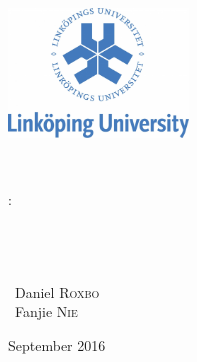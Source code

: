 \begin{titlepage}
\thispagestyle{empty}
\begin{center}

\begin{minipage}[t]{0.48\textwidth}
  \begin{flushleft}
    \includegraphics [width=48mm]{images/logo-univ.jpg} \\[0.5cm]

  \end{flushleft}
\end{minipage}
\begin{minipage}[t]{0.48\textwidth}
  \begin{flushright}

  \end{flushright}
\end{minipage} \\[1.0cm] %

\vspace{5.3cm}

\textsc{\Large \reportsubject :}\\[2cm]

\HRule \\[0.4cm]
{\Large \bfseries \reporttitle}\\[0.4cm]
\HRule \\[1.5cm]

\vspace{1.5cm}

\vspace{4cm}
\begin{minipage}[t]{0.30\textwidth}
  \begin{flushleft} \normalsize
     ~Daniel \textsc{Roxbo}\\
	 ~Fanjie \textsc{Nie} \\                
 \end{flushleft}
\end{minipage}
\begin{minipage}[t]{0.6\textwidth}
  \begin{flushright} \normalsize

  \end{flushright}
\end{minipage}

\vfill
\vspace*{0.420cm}
{\large September 2016 }

\end{center}
\end{titlepage}
